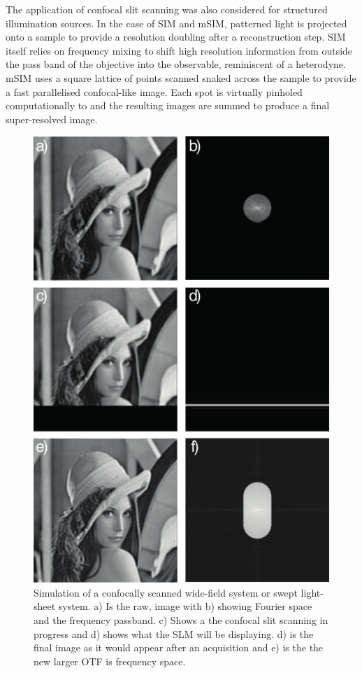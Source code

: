 The application of confocal slit scanning was also considered for structured illumination sources.
In the case of SIM and mSIM, patterned light is projected onto a sample to provide a resolution doubling after a reconstruction step.
SIM itself relies on frequency mixing to shift high resolution information from outside the pass band of the objective into the observable, reminiscent of a heterodyne.
mSIM uses a square lattice of points scanned snaked across the sample to provide a fast parallelised confocal-like image.
Each spot is virtually pinholed computationally to and the resulting images are summed to produce a final super-resolved image.

\begin{figure}
  \centering
  \includegraphics{widefield_slit}
  \caption{Simulation of a confocally scanned wide-field system or swept light-sheet system.
  a) Is the raw, image with b) showing Fourier space and the frequency passband.
  c) Shows a the confocal slit scanning in progress and d) shows what the SLM will be displaying.
  d) is the final image as it would appear after an acquisition and e) is the the new larger OTF is frequency space.
  }
  \label{fig:widefield_slit}
\end{figure}

